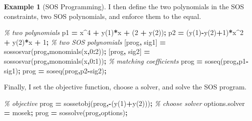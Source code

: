 \documentclass[
]{book}
\newenvironment{Shaded}{\begin{snugshade}}{\end{snugshade}}
\newcommand{\CommentTok}[1]{\textcolor[rgb]{0.56,0.35,0.01}{\textit{#1}}}
\newcommand{\FloatTok}[1]{\textcolor[rgb]{0.00,0.00,0.81}{#1}}
\newcommand{\NormalTok}[1]{#1}
\newcommand{\OperatorTok}[1]{\textcolor[rgb]{0.81,0.36,0.00}{\textbf{#1}}}
\newcommand{\SpecialStringTok}[1]{\textcolor[rgb]{0.31,0.60,0.02}{#1}}
\newcommand{\VariableTok}[1]{\textcolor[rgb]{0.00,0.00,0.00}{#1}}
\theoremstyle{definition}
\theoremstyle{definition}
\newtheorem{example}{Example}[chapter]
\theoremstyle{definition}
\theoremstyle{definition}
\theoremstyle{remark}
\begin{document}
\begin{example}[SOS Programming]
I then define the two polynomials in the SOS constraints, two SOS polynomials, and enforce them to the equal.

\begin{Shaded}
\begin{Highlighting}[]
\CommentTok{\% two polynomials}
\VariableTok{p1} \OperatorTok{=} \VariableTok{x}\OperatorTok{\^{}}\FloatTok{4} \OperatorTok{+} \VariableTok{y}\NormalTok{(}\FloatTok{1}\NormalTok{)}\OperatorTok{*}\VariableTok{x} \OperatorTok{+}\NormalTok{ (}\FloatTok{2} \OperatorTok{+} \VariableTok{y}\NormalTok{(}\FloatTok{2}\NormalTok{))}\OperatorTok{;}
\VariableTok{p2} \OperatorTok{=}\NormalTok{ (}\VariableTok{y}\NormalTok{(}\FloatTok{1}\NormalTok{)}\OperatorTok{{-}}\VariableTok{y}\NormalTok{(}\FloatTok{2}\NormalTok{)}\OperatorTok{+}\FloatTok{1}\NormalTok{)}\OperatorTok{*}\VariableTok{x}\OperatorTok{\^{}}\FloatTok{2} \OperatorTok{+} \VariableTok{y}\NormalTok{(}\FloatTok{2}\NormalTok{)}\OperatorTok{*}\VariableTok{x} \OperatorTok{+} \FloatTok{1}\OperatorTok{;}
\CommentTok{\% two SOS polynomials}
\NormalTok{[}\VariableTok{prog}\OperatorTok{,} \VariableTok{sig1}\NormalTok{] }\OperatorTok{=} \VariableTok{sossosvar}\NormalTok{(}\VariableTok{prog}\OperatorTok{,}\VariableTok{monomials}\NormalTok{(}\VariableTok{x}\OperatorTok{,}\FloatTok{0}\OperatorTok{:}\FloatTok{2}\NormalTok{))}\OperatorTok{;}
\NormalTok{[}\VariableTok{prog}\OperatorTok{,} \VariableTok{sig2}\NormalTok{] }\OperatorTok{=} \VariableTok{sossosvar}\NormalTok{(}\VariableTok{prog}\OperatorTok{,}\VariableTok{monomials}\NormalTok{(}\VariableTok{x}\OperatorTok{,}\FloatTok{0}\OperatorTok{:}\FloatTok{1}\NormalTok{))}\OperatorTok{;}
\CommentTok{\% matching coefficients}
\VariableTok{prog} \OperatorTok{=} \VariableTok{soseq}\NormalTok{(}\VariableTok{prog}\OperatorTok{,}\VariableTok{p1}\OperatorTok{{-}}\VariableTok{sig1}\NormalTok{)}\OperatorTok{;}
\VariableTok{prog} \OperatorTok{=} \VariableTok{soseq}\NormalTok{(}\VariableTok{prog}\OperatorTok{,}\VariableTok{p2}\OperatorTok{{-}}\VariableTok{sig2}\NormalTok{)}\OperatorTok{;}
\end{Highlighting}
\end{Shaded}

Finally, I set the objective function, choose a solver, and solve the SOS program.

\begin{Shaded}
\begin{Highlighting}[]
\CommentTok{\% objective}
\VariableTok{prog} \OperatorTok{=} \VariableTok{sossetobj}\NormalTok{(}\VariableTok{prog}\OperatorTok{,{-}}\NormalTok{(}\VariableTok{y}\NormalTok{(}\FloatTok{1}\NormalTok{)}\OperatorTok{+}\VariableTok{y}\NormalTok{(}\FloatTok{2}\NormalTok{)))}\OperatorTok{;}
\CommentTok{\% choose solver}
\VariableTok{options}\NormalTok{.}\VariableTok{solver} \OperatorTok{=} \SpecialStringTok{\textquotesingle{}mosek\textquotesingle{}}\OperatorTok{;}
\VariableTok{prog} \OperatorTok{=} \VariableTok{sossolve}\NormalTok{(}\VariableTok{prog}\OperatorTok{,}\VariableTok{options}\NormalTok{)}\OperatorTok{;}
\end{Highlighting}
\end{Shaded}


\end{example}
\end{document}
